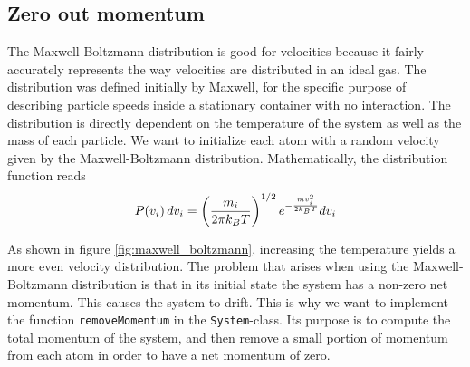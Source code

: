 \documentclass[a4paper]{article}
\begin{document}
\subsection{Zero out momentum}
\label{sub:zero_out_momentum}

    The Maxwell-Boltzmann distribution is good for velocities because it fairly
    accurately represents the way velocities are distributed in an ideal gas.
    The distribution was defined initially by Maxwell, for the specific purpose
    of describing particle speeds inside a stationary container with no
    interaction.  The distribution is directly dependent on the temperature of
    the system as well as the mass of each particle. We want to initialize each
    atom with a random velocity given by the Maxwell-Boltzmann distribution.
    Mathematically, the distribution function reads
    \begin{equation}
        \notag
        P(v_i)\, dv_i = \left( \frac{m_i}{2\pi k_BT} \right)^{1/2} e^{-\frac{mv_i^2}{2k_BT}}dv_i
    \end{equation}

    As shown in figure \ref{fig:maxwell_boltzmann}, increasing the temperature
    yields a more even velocity distribution. 
    The problem that arises when using the Maxwell-Boltzmann distribution is
    that in its initial state the system has a non-zero net momentum. This
    causes the system to drift. This is why we want to implement the function
    \texttt{removeMomentum} in the \texttt{System}-class. Its purpose is to
    compute the total momentum of the system, and then remove a small portion
    of momentum from each atom in order to have a net momentum of zero. 
\end{document}
